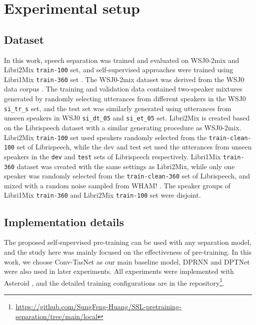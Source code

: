 \documentclass[a4paper]{article}
\begin{document}
\section{Experimental setup}
\label{sec:exp-setup}

\subsection{Dataset}
\label{ssec:dataset}

In this work, speech separation was trained and evaluated on WSJ0-2mix \cite{hershey2016deep} and Libri2Mix \cite{cosentino2020librimix}  \texttt{train-100} set, and self-supervised approaches were trained using Libri1Mix \cite{cosentino2020librimix} \texttt{train-360} set \cite{cosentino2020librimix}.
The WSJ0-2mix dataset was derived from the WSJ0 data corpus \cite{garofolo1993csr}. The training and validation data contained two-speaker mixtures generated by randomly selecting utterances from different speakers in the WSJ0 \texttt{si\_tr\_s} set, and the test set was similarly generated using utterances from unseen speakers in WSJ0 \texttt{si\_dt\_05} and \texttt{si\_et\_05} set.
Libri2Mix is created based on the Librispeech dataset \cite{panayotov2015librispeech} with a similar generating procedure as WSJ0-2mix. 
Libri2Mix \texttt{train-100} set used speakers randomly selected from the \texttt{train-clean-100} set of Librispeech, while the dev and test set used the utterances from unseen speakers in the \texttt{dev} and \texttt{test} sets of Librispeech respectively.
Libri1Mix \texttt{train-360} dataset was created with the same settings as Libri2Mix, while only one speaker was randomly selected from the \texttt{train-clean-360} set of Librispeech, and mixed with a random noise sampled from WHAM! \cite{wichern2019wham}. The speaker groups of Libri1Mix \texttt{train-360} and Libri2Mix \texttt{train-100} set were disjoint.

\subsection{Implementation details}
\label{ssec:detail}

The proposed self-supervised pre-training can be used with any separation model, and the study here was mainly focused on the effectiveness of pre-training.
In this work, we choose Conv-TasNet \cite{luo2019conv} as our main baseline model, DPRNN \cite{luo2020dual} and DPTNet \cite{chen2020dual} were also used in later experiments.
All experiments were implemented with Asteroid \cite{pariente2020asteroid}, and the detailed training configurations are in the repository\footnote{\url{https://github.com/SungFeng-Huang/SSL-pretraining-separation/tree/main/local}}.
\end{document}
